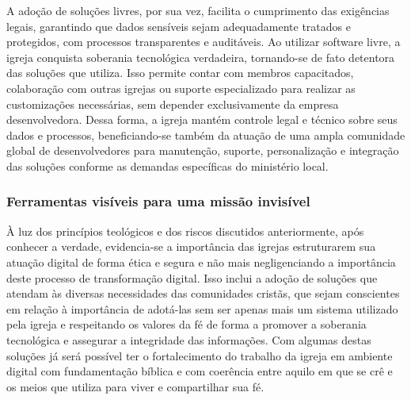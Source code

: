 A adoção de soluções livres, por sua vez, facilita o cumprimento das exigências legais, garantindo que dados sensíveis sejam adequadamente tratados e protegidos, com processos transparentes e auditáveis. Ao utilizar software livre, a igreja conquista soberania tecnológica verdadeira, tornando-se de fato detentora das soluções que utiliza. Isso permite contar com membros capacitados, colaboração com outras igrejas ou suporte especializado para realizar as customizações necessárias, sem depender exclusivamente da empresa desenvolvedora. Dessa forma, a igreja mantém controle legal e técnico sobre seus dados e processos, beneficiando-se também da atuação de uma ampla comunidade global de desenvolvedores para manutenção, suporte, personalização e integração das soluções conforme as demandas específicas do ministério local.

\subsubsection{Ferramentas visíveis para uma missão invisível}

À luz dos princípios teológicos e dos riscos discutidos anteriormente, após conhecer a verdade, evidencia-se a importância das igrejas estruturarem sua atuação digital de forma ética e segura e não mais negligenciando a importância deste processo de transformação digital. Isso inclui a adoção de soluções que atendam às diversas necessidades das comunidades cristãs, que sejam conscientes em relação à importância de adotá-las sem ser apenas mais um sistema utilizado pela igreja e respeitando os valores da fé de forma a promover a soberania tecnológica e assegurar a integridade das informações. Com algumas destas soluções já será possível ter o fortalecimento do trabalho da igreja em ambiente digital com fundamentação bíblica e com coerência entre aquilo em que se crê e os meios que utiliza para viver e compartilhar sua fé.

